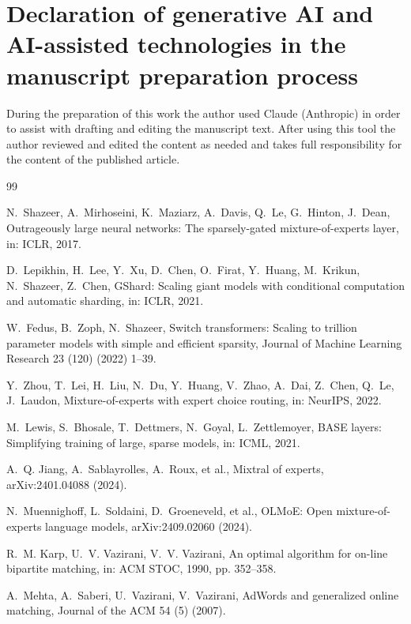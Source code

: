 \documentclass[preprint,12pt]{elsarticle}
\theoremstyle{plain}
\theoremstyle{remark}
\begin{document}
\section*{Declaration of generative AI and AI-assisted technologies in the
manuscript preparation process}
During the preparation of this work the author used Claude (Anthropic) in
order to assist with drafting and editing the manuscript text. After using
this tool the author reviewed and edited the content as needed and takes
full responsibility for the content of the published article.

\begin{thebibliography}{99}

 N.~Shazeer, A.~Mirhoseini, K.~Maziarz, A.~Davis,
Q.~Le, G.~Hinton, J.~Dean, Outrageously large neural networks: The
sparsely-gated mixture-of-experts layer, in: ICLR, 2017.

 D.~Lepikhin, H.~Lee, Y.~Xu, D.~Chen, O.~Firat, Y.~Huang,
M.~Krikun, N.~Shazeer, Z.~Chen, {GShard}: Scaling giant models with
conditional computation and automatic sharding, in: ICLR, 2021.

 W.~Fedus, B.~Zoph, N.~Shazeer, Switch transformers:
Scaling to trillion parameter models with simple and efficient sparsity,
Journal of Machine Learning Research 23 (120) (2022) 1--39.

 Y.~Zhou, T.~Lei, H.~Liu, N.~Du, Y.~Huang, V.~Zhao,
A.~Dai, Z.~Chen, Q.~Le, J.~Laudon, Mixture-of-experts with expert choice
routing, in: NeurIPS, 2022.

 M.~Lewis, S.~Bhosale, T.~Dettmers, N.~Goyal,
L.~Zettlemoyer, {BASE} layers: Simplifying training of large, sparse
models, in: ICML, 2021.

 A.~Q. Jiang, A.~Sablayrolles, A.~Roux, et al., Mixtral of
experts, arXiv:2401.04088 (2024).

 N.~Muennighoff, L.~Soldaini, D.~Groeneveld, et al.,
{OLMoE}: Open mixture-of-experts language models, arXiv:2409.02060 (2024).

 R.~M. Karp, U.~V. Vazirani, V.~V. Vazirani, An optimal
algorithm for on-line bipartite matching, in: ACM STOC, 1990, pp. 352--358.

 A.~Mehta, A.~Saberi, U.~Vazirani, V.~Vazirani, {AdWords}
and generalized online matching, Journal of the ACM 54 (5) (2007).


\end{thebibliography}
\end{document}
